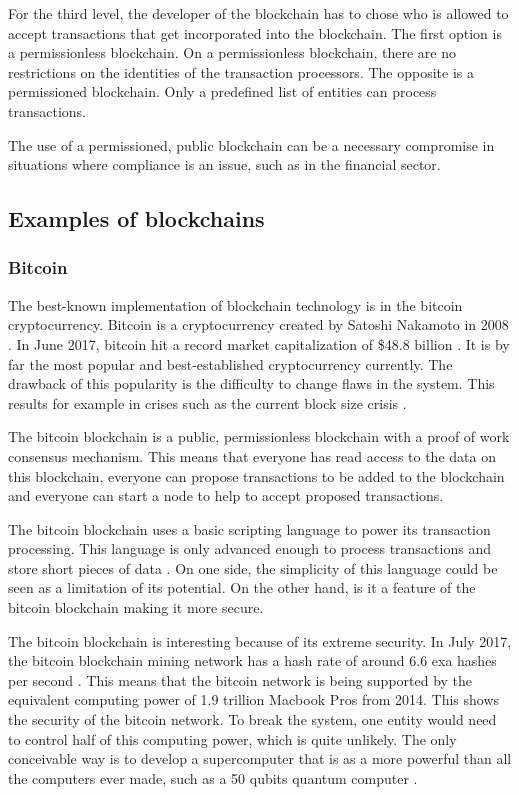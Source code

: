 For the third level, the developer of the blockchain has to chose who is allowed to accept transactions that get incorporated into the blockchain. The first option is a permissionless blockchain. On a permissionless blockchain, there are no restrictions on the identities of the transaction processors. The opposite is a permissioned blockchain. Only a predefined list of entities can process transactions. 

The use of a permissioned, public blockchain can be a necessary compromise in situations where compliance is an issue, such as in the financial sector.


\subsection{Examples of blockchains}

\subsubsection{Bitcoin}


The best-known implementation of blockchain technology is in the bitcoin cryptocurrency. Bitcoin is a cryptocurrency created by Satoshi Nakamoto in 2008 \cite{bitcoin-paper}. In June 2017, bitcoin hit a record market capitalization of \$48.8 billion \cite{bitcoin-market-cap}. It is by far the most popular and best-established cryptocurrency currently. The drawback of this popularity is the difficulty to change flaws in the system. This results for example in crises such as the current block size crisis \cite{bitcoin-civil-war}.

The bitcoin blockchain is a public, permissionless blockchain with a proof of work consensus mechanism. This means that everyone has read access to the data on this blockchain, everyone can propose transactions to be added to the blockchain and everyone can start a node to help to accept proposed transactions.

The bitcoin blockchain uses a basic scripting language to power its transaction processing. This language is only advanced enough to process transactions and store short pieces of data \cite{antonopoulos:2014}. On one side, the simplicity of this language could be seen as a limitation of its potential. On the other hand, is it a feature of the bitcoin blockchain making it more secure.

The bitcoin blockchain is interesting because of its extreme security. In July 2017, the bitcoin blockchain mining network has a hash rate of around 6.6 exa hashes per second \cite{bitcoin-hash-rate}. This means that the bitcoin network is being supported by the equivalent computing power of 1.9 trillion Macbook Pros from 2014. This shows the security of the bitcoin network. To break the system, one entity would need to control half of this computing power, which is quite unlikely. The only conceivable way is to develop a supercomputer that is as a more powerful than all the computers ever made, such as a 50 qubits quantum computer \cite{quantum-newsweek}.

